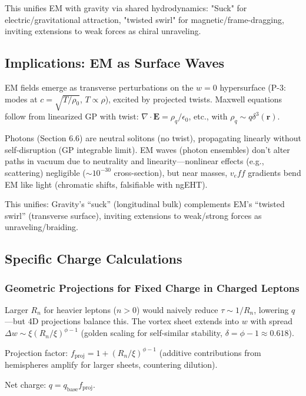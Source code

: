 \documentclass{article}
\begin{document}
This unifies EM with gravity via shared hydrodynamics: "Suck" for electric/gravitational attraction, "twisted swirl" for magnetic/frame-dragging, inviting extensions to weak forces as chiral unraveling.

\subsection{Implications: EM as Surface Waves}

EM fields emerge as transverse perturbations on the $w=0$ hypersurface (P-3: modes at $c = \sqrt{T / \rho_0}$, $T \propto \rho$), excited by projected twists. Maxwell equations follow from linearized GP with twist: $\nabla \cdot \mathbf{E} = \rho_q / \epsilon_0$, etc., with $\rho_q \sim q \delta^3(\mathbf{r})$.

Photons (Section 6.6) are neutral solitons (no twist), propagating linearly without self-disruption (GP integrable limit). EM waves (photon ensembles) don't alter paths in vacuum due to neutrality and linearity---nonlinear effects (e.g., scattering) negligible ($\sim 10^{-30}$ cross-section), but near masses, $v_eff$ gradients bend EM like light (chromatic shifts, falsifiable with ngEHT).

This unifies: Gravity's ``suck'' (longitudinal bulk) complements EM's ``twisted swirl'' (transverse surface), inviting extensions to weak/strong forces as unraveling/braiding.

\subsection{Specific Charge Calculations}

\subsubsection{Geometric Projections for Fixed Charge in Charged Leptons}

Larger $R_n$ for heavier leptons ($n>0$) would naively reduce $\tau \sim 1/R_n$, lowering $q$---but 4D projections balance this. The vortex sheet extends into $w$ with spread $\Delta w \sim \xi (R_n / \xi)^{\phi - 1}$ (golden scaling for self-similar stability, $\delta = \phi - 1 \approx 0.618$).

Projection factor: $f_{\text{proj}} = 1 + (R_n / \xi)^{\phi - 1}$ (additive contributions from hemispheres amplify for larger sheets, countering dilution).

Net charge: $q = q_{\text{base}} f_{\text{proj}}$.
\end{document}
